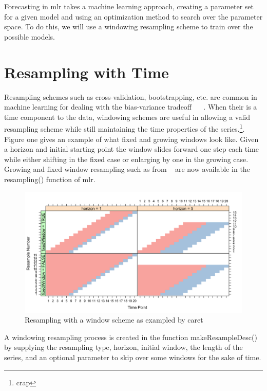 \documentclass{article}\usepackage[]{graphicx}\usepackage[]{color}
\makeatletter
\theoremstyle{definition}
\newcommand\code{\@codex}
\def\@codex#1{{\normalfont\ttfamily\hyphenchar\font=-1 #1}}
\newcommand{\pkg}[1]{{\fontseries{b}\selectfont #1}}
\makeatother
\begin{document}
Forecasting in \pkg{mlr} takes a machine learning approach, creating a parameter set for a given model and using an optimization method to search over the parameter space. To do this, we will use a windowing resampling scheme to train over the possible models.

\section{Resampling with Time}

Resampling schemes such as cross-validation, bootstrapping, etc. are common in machine learning for dealing with the bias-variance tradeoff ~\cite{Friedman1997} ~\cite{rodriguezkfold}. When their is a time component to the data, windowing schemes are useful in allowing a valid resampling scheme while still maintaining the time properties of the series.\footnote{crap}. Figure one gives an example of what fixed and growing windows look like. Given a horizon and initial starting point the window slides forward one step each time while either shifting in the fixed case or enlarging by one in the growing case. Growing and fixed window resampling such as from ~\cite{hyndman2014forecasting} are now available in the \code{resampling()} function of \pkg{mlr}. 

\begin{figure}[ht]
\caption{Resampling with a window scheme as exampled by caret ~\cite{windowingcaret} }
  \includegraphics[scale = .2]{windowing_pic_caret}
  \centering
\end{figure}
\newpage

A windowing resampling process is created in the function \code{makeResampleDesc()} by supplying the resampling type, horizon, initial window, the length of the series, and an optional parameter to skip over some windows for the sake of time.
\end{document}
